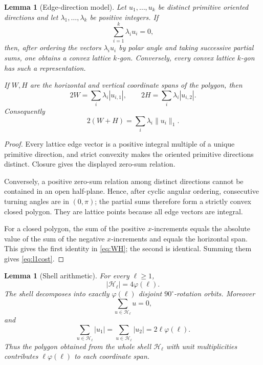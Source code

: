 \documentclass[11pt]{article}
\newtheorem{lemma}[theorem]{Lemma}
\theoremstyle{definition}
\newcommand{\HH}{\mathcal H}
\newcommand{\ph}{\varphi}
\begin{document}
\begin{lemma}[Edge-direction model]\label{lem:model}
Let \(u_1,\ldots,u_k\) be distinct primitive oriented directions and let
\(\lambda_1,\ldots,\lambda_k\) be positive integers.  If
\[
\sum_{i=1}^k\lambda_i u_i=0,
\]
then, after ordering the vectors \(\lambda_i u_i\) by polar angle and taking successive partial sums, one obtains a convex lattice \(k\)-gon.  Conversely, every convex lattice \(k\)-gon has such a representation.

If \(W,H\) are the horizontal and vertical coordinate spans of the polygon, then
\begin{equation}\label{eq:WH}
2W=\sum_i\lambda_i|u_{i,1}|,\qquad
2H=\sum_i\lambda_i|u_{i,2}|.
\end{equation}
Consequently
\begin{equation}\label{eq:l1cost}
2(W+H)=\sum_i\lambda_i\|u_i\|_1.
\end{equation}
\end{lemma}

\begin{proof}
Every lattice edge vector is a positive integral multiple of a unique primitive direction, and strict convexity makes the oriented primitive directions distinct.  Closure gives the displayed zero-sum relation.

Conversely, a positive zero-sum relation among distinct directions cannot be contained in an open half-plane.  Hence, after cyclic angular ordering, consecutive turning angles are in \((0,\pi)\); the partial sums therefore form a strictly convex closed polygon.  They are lattice points because all edge vectors are integral.

For a closed polygon, the sum of the positive \(x\)-increments equals the absolute value of the sum of the negative \(x\)-increments and equals the horizontal span.  This gives the first identity in \eqref{eq:WH}; the second is identical.  Summing them gives \eqref{eq:l1cost}.
\end{proof}

\begin{lemma}[Shell arithmetic]\label{lem:shell}
For every \(\ell\ge1\),
\[
|\HH_\ell|=4\ph(\ell).
\]
The shell decomposes into exactly \(\ph(\ell)\) disjoint \(90^\circ\)-rotation orbits.  Moreover
\[
\sum_{u\in\HH_\ell}u=0,
\]
and
\[
\sum_{u\in\HH_\ell}|u_1|
=
\sum_{u\in\HH_\ell}|u_2|
=
2\ell\ph(\ell).
\]
Thus the polygon obtained from the whole shell \(\HH_\ell\) with unit multiplicities contributes \(\ell\ph(\ell)\) to each coordinate span.
\end{lemma}
\end{document}
